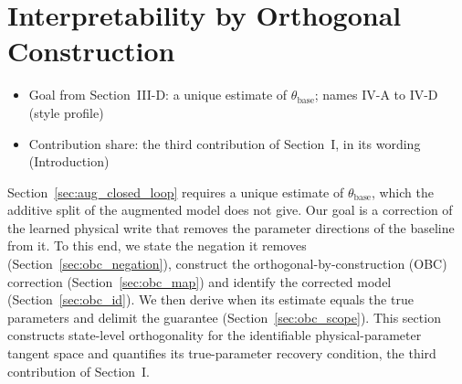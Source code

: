 \section{Interpretability by Orthogonal Construction}\label{sec:obc}
\ifdraft
\begin{itemize}
\item Goal from Section~III-D: a unique estimate of $\theta_{\mathrm{base}}$; names IV-A to IV-D (style profile)
\item Contribution share: the third contribution of Section~I, in its wording (Introduction)
\end{itemize}
\fi

Section~\ref{sec:aug_closed_loop} requires a unique estimate of
$\theta_{\mathrm{base}}$, which the additive split of the augmented model does
not give.
Our goal is a correction of the learned physical write that removes the
parameter directions of the baseline from it.
To this end, we state the negation it removes
(Section~\ref{sec:obc_negation}), construct the
orthogonal-by-construction (OBC) correction (Section~\ref{sec:obc_map}) and
identify the corrected model (Section~\ref{sec:obc_id}).
We then derive when its estimate equals the true parameters and delimit the
guarantee (Section~\ref{sec:obc_scope}).
This section constructs state-level orthogonality for the identifiable
physical-parameter tangent space and quantifies its true-parameter recovery
condition, the third contribution of Section~I.

